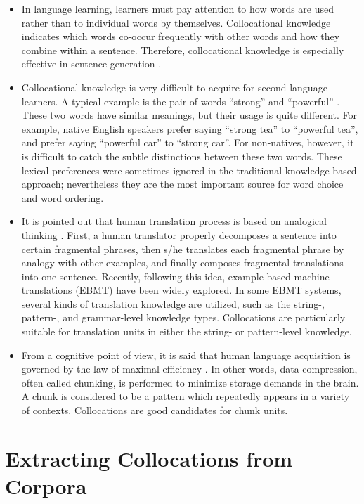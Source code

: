 \begin{itemize}
\item
In language learning, learners must pay attention to
how words are used rather than to individual words by themselves.
Collocational knowledge indicates
which words co-occur frequently with other words and
how they combine within a sentence.
Therefore, collocational knowledge is especially effective
in sentence generation
\cite{Smadja90}.

\item
Collocational knowledge is very difficult
to acquire for second language learners.
A typical example is the pair of words ``strong'' and ``powerful''
\cite{Church91,Smadja91}.
These two words have similar meanings,
but their usage is quite different.
For example, native English speakers prefer saying
``strong tea'' to ``powerful tea'',
and prefer saying ``powerful car'' to ``strong car''.
For non-natives, however,
it is difficult to catch the subtle distinctions between these two words.
These lexical preferences were sometimes ignored
in the traditional knowledge-based approach;
nevertheless they are the most important source
for word choice and word ordering.

\item
It is pointed out that human translation process
is based on analogical thinking \cite{Nagao84}.
First, a human translator properly decomposes a sentence
into certain fragmental phrases, then s/he translates
each fragmental phrase by analogy with other examples,
and finally composes fragmental translations into one sentence.
Recently, following this idea,
example-based machine translations (EBMT) have been widely explored.
In some EBMT systems, several kinds of translation knowledge
are utilized, such as the string-, pattern-, and grammar-level
knowledge types.
Collocations are particularly suitable for translation units
in either the string- or pattern-level knowledge.


\item
From a cognitive point of view,
it is said that human language acquisition is governed by
the law of maximal efficiency \cite{Wolff91}.
In other words, data compression, often called chunking, is performed to
minimize storage demands in the brain.
A chunk is considered to be a pattern which repeatedly appears
in a variety of contexts.
Collocations are good candidates for chunk units.
\end{itemize}


\section{Extracting Collocations from Corpora}

